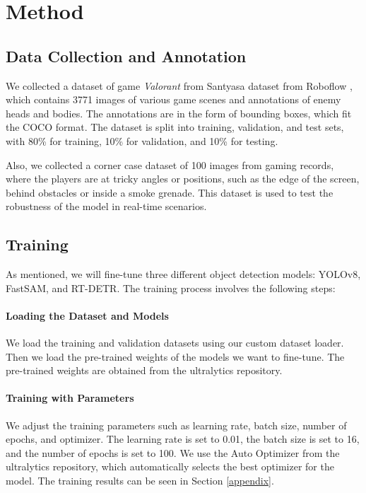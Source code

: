 \documentclass{article}
\begin{document}
\section{Method}
\label{method}

\subsection{Data Collection and Annotation}

We collected a dataset of game \textit{Valorant} from Santyasa dataset from Roboflow \cite{santyasa_roboflow}, which contains 3771 images of various game scenes and annotations of enemy heads and bodies. The annotations are in the form of bounding boxes, which fit the COCO format. The dataset is split into training, validation, and test sets, with 80\% for training, 10\% for validation, and 10\% for testing.

Also, we collected a corner case dataset of 100 images from gaming records, where the players are at tricky angles or positions, such as the edge of the screen, behind obstacles or inside a smoke grenade. This dataset is used to test the robustness of the model in real-time scenarios.

\subsection{Training}

As mentioned, we will fine-tune three different object detection models: YOLOv8, FastSAM, and RT-DETR. The training process involves the following steps:

\paragraph{Loading the Dataset and Models} We load the training and validation datasets using our custom dataset loader. Then we load the pre-trained weights of the models we want to fine-tune. The pre-trained weights are obtained from the ultralytics repository.

\paragraph{Training with Parameters} We adjust the training parameters such as learning rate, batch size, number of epochs, and optimizer. The learning rate is set to 0.01, the batch size is set to 16, and the number of epochs is set to 100. We use the Auto Optimizer from the ultralytics repository, which automatically selects the best optimizer for the model. The training results can be seen in Section \ref{appendix}.
\end{document}
